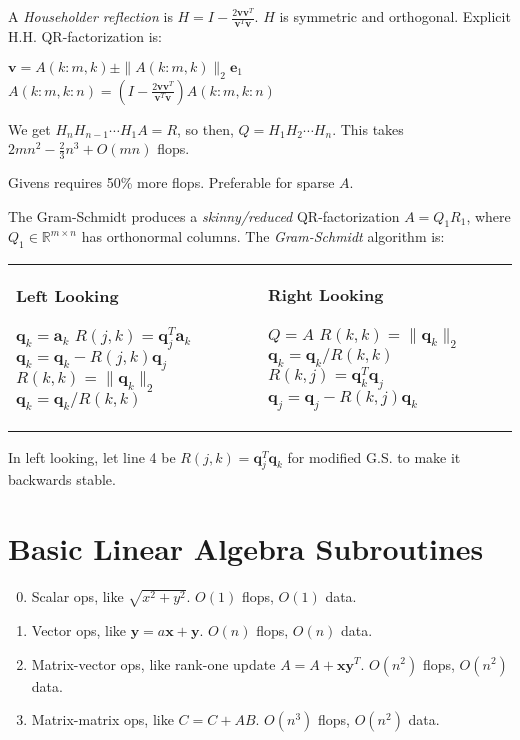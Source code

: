 \documentclass[landscape,10pt,letterpaper]{article}
\newcommand{\heading}[1]{\vspace{-1.5em} \section*{#1} \vspace{-1.0em}}
\begin{document}
\begin{multicols}{4}
A \emph{Householder reflection} is $H = I - \frac{2 \mathbf{v} \mathbf{v}^T}{\mathbf{v}^T \mathbf{v}}$.  $H$ is symmetric and orthogonal.  Explicit H.H. QR-factorization is:

\begin{algorithmic}[1]
	\STATE $\mathbf{v} = A(k:m, k) \pm \| A(k:m, k) \|_2 \mathbf{e}_1$
	\STATE $A(k:m, k:n) = \left( I - \frac{2 \mathbf{v} \mathbf{v}^T}{\mathbf{v}^T \mathbf{v}} \right) A(k:m, k:n)$
\ENDFOR
\end{algorithmic}
We get $H_n H_{n-1} \cdots H_1 A = R$, so then, $Q = H_1 H_2 \cdots H_n$.  This takes $2mn^2 - \frac{2}{3} n^3 + O(mn)$ flops.

Givens requires 50\% more flops.  Preferable for sparse $A$.

The Gram-Schmidt produces a \emph{skinny/reduced} QR-factorization $A = Q_1 R_1$, where $Q_1 \in \mathbb{R}^{m \times n}$ has orthonormal columns.  The \emph{Gram-Schmidt} algorithm is:

\begin{tabular}[t]{p{0.5\linewidth}@{}p{0.5\linewidth}} \textbf{Left Looking}

\begin{algorithmic}[1]
\FOR{$k=1:n$}
	\STATE $\mathbf{q}_k = \mathbf{a}_k$
	\FOR{$j=1:k-1$}
		\STATE $R(j,k) = \mathbf{q}_j^T \mathbf{a}_k$
		\STATE $\mathbf{q}_k = \mathbf{q}_k - R(j,k) \mathbf{q}_j$
	\ENDFOR
	\STATE $R(k,k) = \| \mathbf{q}_k \|_2$
	\STATE $\mathbf{q}_k = \mathbf{q}_k / R(k,k)$
\ENDFOR
\end{algorithmic} & \textbf{Right Looking}

\begin{algorithmic}[1]
\STATE $Q = A$
\FOR{$k=1:n$}
    \STATE $R(k,k) = \| \mathbf{q}_k \|_2$
    \STATE $\mathbf{q}_k = \mathbf{q}_k / R(k,k)$
    \FOR{$j=k+1:n$}
        \STATE $R(k,j) = \mathbf{q}_k^T \mathbf{q}_j$
        \STATE $\mathbf{q}_j = \mathbf{q}_j - R(k,j) \mathbf{q}_k$
    \ENDFOR
\ENDFOR
\end{algorithmic}
\end{tabular}

\vspace{-1.0em}
In left looking, let line 4 be $R(j,k) = \mathbf{q}_j^T \mathbf{q}_{k}$ for modified G.S. to make it backwards stable.

\heading{Basic Linear Algebra Subroutines}

\begin{enumerate}[topsep=0pt, partopsep=0pt, itemsep=-4pt]
\setcounter{enumi}{-1}
\item Scalar ops, like $\sqrt{x^2 + y^2}$. $O(1)$ flops, $O(1)$ data.
\item Vector ops, like $\mathbf{y} = a \mathbf{x} + \mathbf{y}$. $O(n)$ flops, $O(n)$ data.
\item Matrix-vector ops, like rank-one update $A = A + \mathbf{x} \mathbf{y}^T$. $O(n^2)$ flops, $O(n^2)$ data.
\item Matrix-matrix ops, like $C = C + AB$. $O(n^3)$ flops, $O(n^2)$ data.
\end{enumerate}


\end{multicols}
\end{document}
